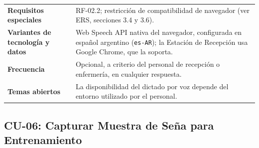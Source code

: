 \begin{longtable}{@{}>{\raggedright\arraybackslash}p{4.1cm} >{\raggedright\arraybackslash}p{\dimexpr\textwidth-4.1cm-2\tabcolsep\relax}@{}}
\textbf{Requisitos especiales} & RF-02.2; restricción de compatibilidad de navegador (ver ERS, secciones 3.4 y 3.6). \\
\textbf{Variantes de tecnología y datos} &
Web Speech API nativa del navegador, configurada en español argentino
(\texttt{es-AR}); la Estación de Recepción usa Google Chrome, que la
soporta. \\
\textbf{Frecuencia} & Opcional, a criterio del personal de recepción o enfermería, en cualquier respuesta. \\
\textbf{Temas abiertos} &
La disponibilidad del dictado por voz depende del entorno utilizado por
el personal. \\
\bottomrule
\end{longtable}

\subsection{CU-06: Capturar Muestra de Seña para Entrenamiento}

